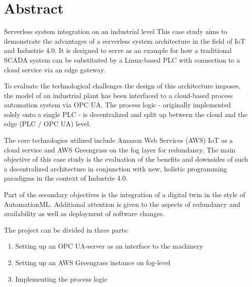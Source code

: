 
\section*{Abstract}
%

Serverless system integration on an industrial level
This case study aims to demonstrate the advantages of a serverless system architecture in the field of IoT and Industrie 4.0.
It is designed to serve as an example for how a traditional SCADA system can be substituted by a Linux-based PLC with connection to a cloud service via an edge gateway.

To evaluate the technological challenges the design of this architecture imposes, the model of an industrial plant has been interfaced to a cloud-based process automation system via OPC UA. The process logic - originally implemented solely onto a single PLC - is decentralized and split up between the cloud and the edge (PLC / OPC UA) level.

The core technologies utilized include Amazon Web Services (AWS) IoT as a cloud service and AWS Greengrass on the fog layer for redundancy.
The main objective of this case study is the evaluation of the benefits and downsides of such a decentralized architecture in conjunction with new, holistic programming paradigms in the context of Industrie 4.0.

Part of the secondary objectives is the integration of a digital twin in the style of AutomationML. Additional attention is given to the aspects of redundancy and availability as well as deployment of software changes.

The project can be divided in three parts:
\begin{enumerate}
  \item{Setting up an OPC UA-server as an interface to the machinery}
  \item{Setting up an AWS Greengrass instance on fog-level}
  \item{Implementing the process logic}
\end{enumerate}
